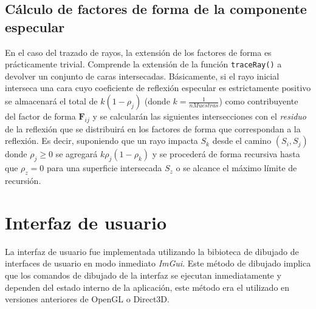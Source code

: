 \subsection{Cálculo de factores de forma de la componente especular}

En el caso del trazado de rayos, la extensión de los factores de forma es prácticamente trivial. Comprende la extensión de la función \verb|traceRay()| a devolver un conjunto de caras intersecadas. Básicamente, si el rayo inicial interseca una cara cuyo coeficiente de reflexión especular es estrictamente positivo se almacenará el total de $k(1 - \rho_{j})$ (donde $k = \frac{1}{nMuestras}$) como contribuyente del factor de forma $\mathbf{F}_{ij}$ y se calcularán las siguientes intersecciones con el \textit{residuo} de la reflexión que se distribuirá en los factores de forma que correspondan a la reflexión. Es decir, suponiendo que un rayo impacta $S_{k}$ desde el camino $(S_{i}, S_{j})$ donde $\rho_{j} \ge 0$ se agregará $k\rho_{j}(1 - \rho_{k})$ y se procederá de forma recursiva hasta que $\rho_{z} = 0$ para una superficie intersecada $S_{z}$ o se alcance el máximo límite de recursión.

\section {Interfaz de usuario}

La interfaz de usuario fue implementada utilizando la bibioteca de dibujado de interfaces de usuario en modo inmediato \textit{ImGui}. Este método de dibujado implica que los comandos de dibujado de la interfaz se ejecutan inmediatamente y dependen del estado interno de la aplicación, este método era el utilizado en versiones anteriores de OpenGL o Direct3D.